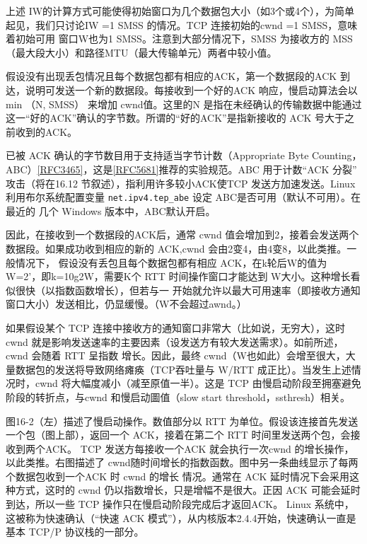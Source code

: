 上述 IW的计算方式可能使得初始窗口为几个数据包大小（如3个或4个），为简单起见，我们只讨论IW =1 SMSS 的情况。TCP 连接初始的cwnd =1 SMSS，意味着初始可用
窗口W也为1 SMSS。注意到大部分情况下，SMSS 为接收方的 MSS（最大段大小）和路径MTU（最大传输单元）两者中较小值。

假设没有出现丢包情况且每个数据包都有相应的ACK，第一个数据段的ACK 到达，说明可发送一个新的数据段。每接收到一个好的ACK 响应，慢启动算法会以 min （N, SMSS）
来增加 cwnd值。这里的N 是指在未经确认的传输数据中能通过这一“好的ACK”确认的字节数。所谓的“好的ACK”是指新接收的 ACK 号大于之前收到的ACK。

\begin{tcolorbox}
    已被 ACK 确认的字节数目用于支持适当字节计数（Appropriate Byte Counting，ABC）\href{https://www.rfc-editor.org/rfc/rfc3465}{[RFC3465]}，这是\href{https://www.rfc-editor.org/rfc/rfc5681}{[RFC5681]}推荐的实验规范。ABC 用于计数“ACK 分裂”
    攻击（将在16.12 节叙述），指利用许多较小ACK使TCP 发送方加速发送。Linux 利用布尔系统配置变量 \verb|net.ipv4.tep_abe| 设定 ABC是否可用（默认不可用）。在最近的
    几个 Windows 版本中，ABC默认开启。
\end{tcolorbox}

因此，在接收到一个数据段的ACK后，通常 cwnd 值会增加到2，接着会发送两个数据段。如果成功收到相应的新的 ACK,cwnd 会由2变4，由4变8，以此类推。一般情况下，
假设没有丢包且每个数据包都有相应 ACK，在k轮后W的值为W=2’，即k=10g2W，需要K个 RTT 时间操作窗口才能达到 W大小。这种增长看似很快（以指数函数增长），但若与一
开始就允许以最大可用速率（即接收方通知窗口大小）发送相比，仍显缓慢。（W不会超过awnd。）

如果假设某个 TCP 连接中接收方的通知窗口非常大（比如说，无穷大），这时 cwnd 就是影响发送速率的主要因素（设发送方有较大发送需求）。如前所述，cwnd 会随着 RTT 呈指数
增长。因此，最终 cwnd（W也如此）会增至很大，大量数据包的发送将导致网络瘫痪（TCP吞吐量与 W/RTT 成正比）。当发生上述情况时，cwnd 将大幅度减小（减至原值一半）。这是
TCP 由慢启动阶段至拥塞避免阶段的转折点，与cwnd 和慢启动圖值（slow start threshold，ssthresh）相关。

图16-2（左）描述了慢启动操作。数值部分以 RTT 为单位。假设该连接首先发送一个包（图上部），返回一个 ACK，接着在第二个 RTT 时间里发送两个包，会接收到两个ACK。
TCP 发送方每接收一个ACK 就会执行一次cwnd 的增长操作，以此类推。右图描述了 cwnd随时间增长的指数函数。图中另一条曲线显示了每两个数据包收到一个ACK 时 cwnd 的增长
情况。通常在 ACK 延时情况下会采用这种方式，这时的 cwnd 仍以指数增长，只是增幅不是很大。正因 ACK 可能会延时到达，所以一些 TCP 操作只在慢启动阶段完成后才返回ACK。
Linux 系统中，这被称为快速确认（“快速 ACK 模式”），从内核版本2.4.4开始，快速确认一直是基本 TCP/P 协议栈的一部分。


